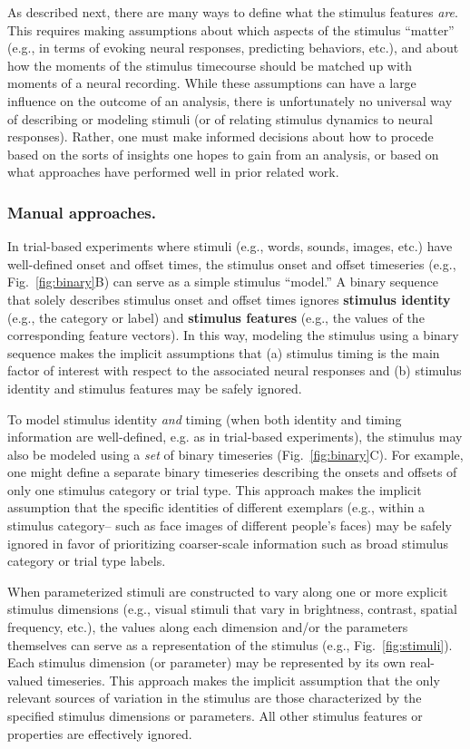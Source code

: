 \documentclass[runningheads]{llncs}
\begin{document}
As described next, there are many ways to define what the stimulus
features \textit{are}.  This requires making assumptions about which
aspects of the stimulus ``matter'' (e.g., in terms of evoking neural
responses, predicting behaviors, etc.), and about how the moments of
the stimulus timecourse should be matched up with moments of a neural
recording.  While these assumptions can have a large influence on the
outcome of an analysis, there is unfortunately no universal way of
describing or modeling stimuli (or of relating stimulus dynamics to
neural responses).  Rather, one must make informed decisions about how
to procede based on the sorts of insights one hopes to gain from an
analysis, or based on what approaches have performed well in prior
related work. 

\subsubsection{Manual approaches.}
In trial-based experiments where stimuli (e.g., words, sounds, images,
etc.) have well-defined onset and offset times, the stimulus onset and
offset timeseries (e.g., Fig.~\ref{fig:binary}B) can serve as a
simple stimulus ``model.''  A binary sequence that solely describes
stimulus onset and offset times ignores \textbf{stimulus identity}
(e.g., the category or label) and \textbf{stimulus features} (e.g.,
the values of the corresponding feature vectors).  In this way,
modeling the stimulus using a binary sequence makes the implicit
assumptions that (a) stimulus timing is the main factor of interest with
respect to the associated neural responses and (b) stimulus identity
and stimulus features may be safely ignored.

To model stimulus identity \textit{and} timing (when both identity and
timing information are well-defined, e.g. as in trial-based
experiments), the stimulus may also be modeled using a \textit{set} of
binary timeseries (Fig.~\ref{fig:binary}C).  For example, one might
define a separate binary timeseries describing the onsets and offsets
of only one stimulus category or trial type.  This approach makes the
implicit assumption that the specific identities of different
exemplars (e.g., within a stimulus category-- such as face images of
different people's faces) may be safely ignored in favor of
prioritizing coarser-scale information such as broad stimulus category
or trial type labels.

When parameterized stimuli are constructed to vary along one or more
explicit stimulus dimensions (e.g., visual stimuli that vary in
brightness, contrast, spatial frequency, etc.), the values along each
dimension and/or the parameters themselves can serve as a
representation of the stimulus (e.g., Fig.~\ref{fig:stimuli}).  Each
stimulus dimension (or parameter) may be represented by its own
real-valued timeseries.  This approach makes the implicit assumption
that the only relevant sources of variation in the stimulus are those
characterized by the specified stimulus dimensions or parameters.  All
other stimulus features or properties are effectively ignored.
\end{document}
